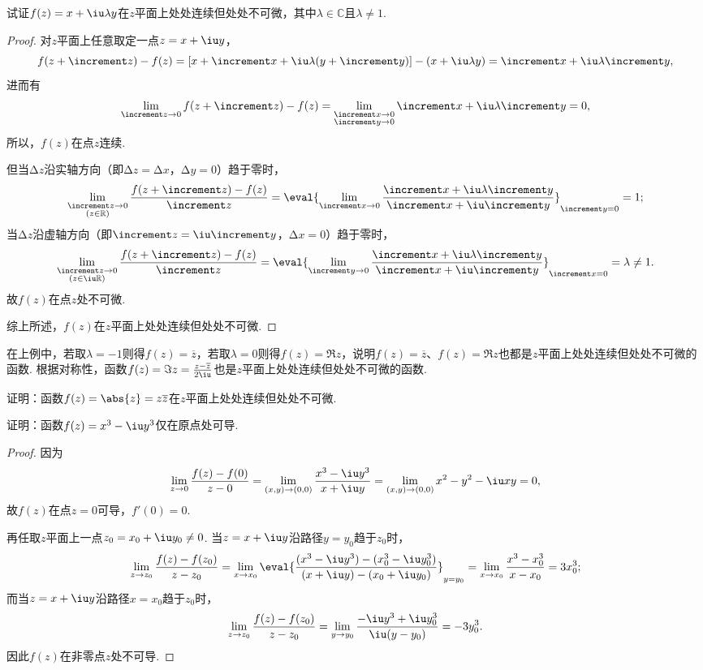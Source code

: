 \begin{example}
试证\(f(z)=x+\iu \lambda y\)在\(z\)平面上处处连续但处处不可微，其中\(\lambda \in \mathbb{C}\)且\(\lambda \neq 1\).
\begin{proof}
对\(z\)平面上任意取定一点\(z=x+\iu y\)，\[
f(z+\increment z)-f(z) = [x + \increment x + \iu \lambda (y + \increment y)] - (x + \iu \lambda y) = \increment x + \iu \lambda \increment y,
\]进而有\[
\lim_{\increment z\to0} f(z+\increment z)-f(z)
= \lim_{\substack{\increment x\to0 \\ \increment y\to0}} \increment x + \iu \lambda \increment y
= 0,
\]所以，\(f(z)\)在点\(z\)连续.

但当\(\increment z\)沿实轴方向（即\(\increment z = \increment x\)，\(\increment y = 0\)）趋于零时，\[
\lim_{\substack{\increment z\to0 \\ (z \in \mathbb{R})}} \frac{f(z+\increment z)-f(z)}{\increment z}
= \eval{\lim_{\increment x\to0} \frac{\increment x + \iu \lambda \increment y}{\increment x + \iu \increment y}}_{\increment y = 0} = 1;
\]当\(\increment z\)沿虚轴方向（即\(\increment z = \iu \increment y\)，\(\increment x = 0\)）趋于零时，\[
\lim_{\substack{\increment z\to0 \\ (z \in \iu \mathbb{R})}} \frac{f(z+\increment z)-f(z)}{\increment z}
= \eval{\lim_{\increment y\to0} \frac{\increment x + \iu \lambda \increment y}{\increment x + \iu \increment y}}_{\increment x = 0} = \lambda \neq 1.
\]故\(f(z)\)在点\(z\)处不可微.

综上所述，\(f(z)\)在\(z\)平面上处处连续但处处不可微.
\end{proof}
\end{example}
在上例中，若取\(\lambda=-1\)则得\(f(z) = \overline{z}\)，若取\(\lambda=0\)则得\(f(z) = \Re z\)，说明\(f(z) = \overline{z}\)、\(f(z) = \Re z\)也都是\(z\)平面上处处连续但处处不可微的函数.
根据对称性，函数\(f(z) = \Im z = \frac{z - \overline{z}}{2\iu}\)也是\(z\)平面上处处连续但处处不可微的函数.

\begin{example}
证明：函数\(f(z) = \abs{z} = z \overline{z}\)在\(z\)平面上处处连续但处处不可微.
\end{example}

\begin{example}
证明：函数\(f(z) = x^3 - \iu y^3\)仅在原点处可导.
\begin{proof}
因为\[
\lim_{z\to0} \frac{f(z) - f(0)}{z - 0}
= \lim_{(x,y)\to(0,0)} \frac{x^3 - \iu y^3}{x + \iu y}
= \lim_{(x,y)\to(0,0)} x^2 - y^2 - \iu xy
= 0,
\]故\(f(z)\)在点\(z = 0\)可导，\(f'(0) = 0\).

再任取\(z\)平面上一点\(z_0 = x_0 + \iu y_0 \neq 0\).
当\(z = x + \iu y\)沿路径\(y = y_0\)趋于\(z_0\)时，\[
\lim_{z \to z_0} \frac{f(z) - f(z_0)}{z - z_0}
= \lim_{x \to x_0} \eval{\frac{(x^3 - \iu y^3) - (x_0^3 - \iu y_0^3)}{(x + \iu y) - (x_0 + \iu y_0)}}_{y = y_0}
= \lim_{x \to x_0} \frac{x^3 - x_0^3}{x - x_0}
= 3 x_0^3;
\]而当\(z = x + \iu y\)沿路径\(x = x_0\)趋于\(z_0\)时，\[
\lim_{z \to z_0} \frac{f(z) - f(z_0)}{z - z_0}
= \lim_{y \to y_0} \frac{-\iu y^3 + \iu y_0^3}{\iu (y - y_0)}
= -3 y_0^3.
\]因此\(f(z)\)在非零点\(z\)处不可导.
\end{proof}
\end{example}


